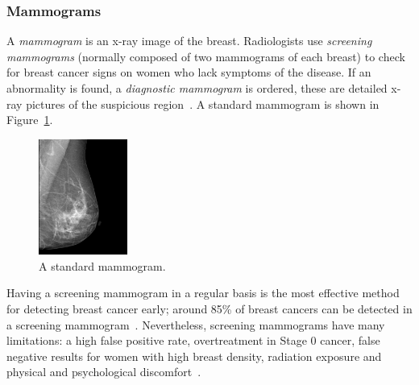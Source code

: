 \subsubsection{Mammograms}
A \emph{mammogram} is an x-ray image of the breast. Radiologists use \emph{screening mammograms} (normally composed of two mammograms of each breast) to check for breast cancer signs on women who lack symptoms of the disease. If an abnormality is found, a \emph{diagnostic mammogram} is ordered, these are detailed x-ray pictures of the suspicious region~\cite{NCI2014}. A standard mammogram is shown in Figure~\ref{fig:normalMammogram}.

\begin{figure}[h]
	\centering
	\includegraphics[width = 0.26\textwidth]{plots/normalMammogram.jpg}
	\caption[A digital mammogram]{A standard mammogram.}
	\label{fig:normalMammogram}
\end{figure}

Having a screening mammogram in a regular basis is the most effective method for detecting breast cancer early; around 85\% of breast cancers can be detected in a screening mammogram~\cite{BCSC2013}. Nevertheless, screening mammograms have many limitations: a high false positive rate, overtreatment in Stage 0 cancer, false negative results for women with high breast density, radiation exposure and physical and psychological discomfort~\cite{NCI2014}.

